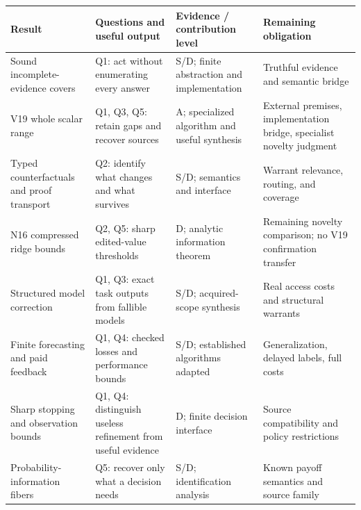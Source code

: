 \documentclass{article}
\theoremstyle{definition}
\begin{document}
{\def\LTcaptype{none} %
\begin{longtable}[]{@{}
  >{\raggedright\arraybackslash}p{}
  >{\raggedright\arraybackslash}p{}
  >{\raggedright\arraybackslash}p{}
  >{\raggedright\arraybackslash}p{}@{}}
\toprule\noalign{}
\begin{minipage}[b]{\linewidth}\raggedright
Result
\end{minipage} & \begin{minipage}[b]{\linewidth}\raggedright
Questions and useful output
\end{minipage} & \begin{minipage}[b]{\linewidth}\raggedright
Evidence / contribution level
\end{minipage} & \begin{minipage}[b]{\linewidth}\raggedright
Remaining obligation
\end{minipage} \\
\midrule\noalign{}
\endhead
\bottomrule\noalign{}
\endlastfoot
Sound incomplete-evidence covers & Q1: act without enumerating every
answer & S/D; finite abstraction and implementation & Truthful evidence
and semantic bridge \\
V19 whole scalar range & Q1, Q3, Q5: retain gaps and recover sources &
A; specialized algorithm and useful synthesis & External premises,
implementation bridge, specialist novelty judgment \\
Typed counterfactuals and proof transport & Q2: identify what changes
and what survives & S/D; semantics and interface & Warrant relevance,
routing, and coverage \\
N16 compressed ridge bounds & Q2, Q5: sharp edited-value thresholds & D;
analytic information theorem & Remaining novelty comparison; no V19
confirmation transfer \\
Structured model correction & Q1, Q3: exact task outputs from fallible
models & S/D; acquired-scope synthesis & Real access costs and
structural warrants \\
Finite forecasting and paid feedback & Q1, Q4: checked losses and
performance bounds & S/D; established algorithms adapted &
Generalization, delayed labels, full costs \\
Sharp stopping and observation bounds & Q1, Q4: distinguish useless
refinement from useful evidence & D; finite decision interface & Source
compatibility and policy restrictions \\
Probability-information fibers & Q5: recover only what a decision needs
& S/D; identification analysis & Known payoff semantics and source
family \\
\end{longtable}
}
\end{document}
